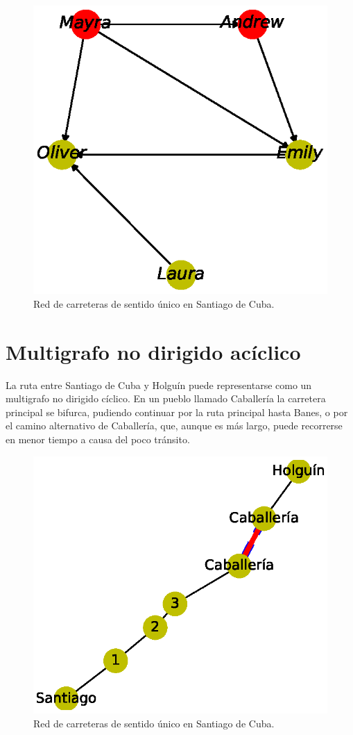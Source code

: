 \documentclass{article}
\begin{document}

\begin{figure}
  \includegraphics[width=.8\columnwidth]{6.eps}
  \caption{Red de carreteras de sentido único en Santiago de Cuba.}
  \label{fig:6}
\end{figure}




\section{Multigrafo no dirigido acíclico}

La ruta entre Santiago de Cuba y Holguín puede representarse  como un multigrafo no dirigido cíclico. En un pueblo llamado Caballería la carretera principal se bifurca, pudiendo continuar por la ruta principal hasta Banes, o por el camino alternativo de Caballería, que, aunque es más largo, puede recorrerse en menor tiempo a causa del poco tránsito.


\begin{figure}
  \includegraphics[width=.8\columnwidth]{7.eps}
  \caption{Red de carreteras de sentido único en Santiago de Cuba.}
  \label{fig:7}
\end{figure}
\end{document}
